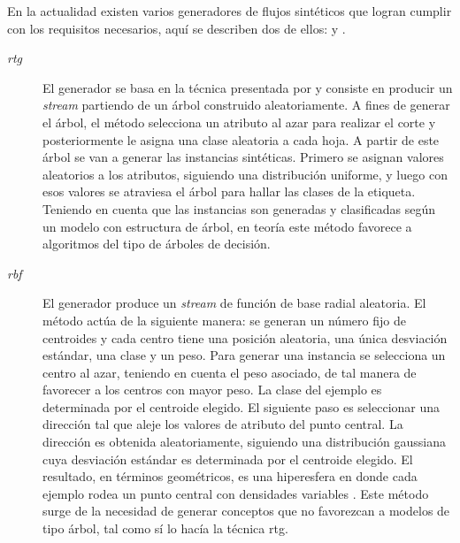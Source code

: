 En la actualidad existen varios generadores de flujos sintéticos que logran
cumplir con los requisitos necesarios, aquí se describen dos de ellos:
 y .

\begin{description}

	\item[\textit{\acrfull{rtg}}] El generador se basa en la técnica presentada
	      por \citeauthor{domingos_mining_2002} \cite{domingos_mining_2002} y
	      consiste en producir un \textit{stream} partiendo de un árbol construido
	      aleatoriamente. A fines de generar el árbol, el método selecciona un
	      atributo al azar para realizar el corte y posteriormente le asigna una
	      clase aleatoria a cada hoja. A partir de este árbol se van a generar las
	      instancias sintéticas.  Primero se asignan valores aleatorios a los
	      atributos, siguiendo una distribución uniforme, y luego con esos valores se
	      atraviesa el árbol para hallar las clases de la etiqueta. Teniendo en
	      cuenta que las instancias son generadas y clasificadas según un modelo con
	      estructura de árbol, en teoría este método favorece a algoritmos del tipo
	      de árboles de decisión.

	\item[\textit{\acrfull{rbf}}] El generador produce un \textit{stream} de
	      función de base radial aleatoria. El método actúa de la siguiente manera:
	      se generan un número fijo de centroides y cada centro tiene una posición
	      aleatoria, una única desviación estándar, una clase y un peso. Para
	      generar una instancia se selecciona un centro al azar, teniendo en cuenta
	      el peso asociado, de tal manera de favorecer a los centros con mayor peso.
	      La clase del ejemplo es determinada por el centroide elegido. El siguiente
	      paso es seleccionar una dirección tal que aleje los valores de atributo
	      del punto central. La dirección es obtenida aleatoriamente, siguiendo una
	      distribución gaussiana cuya desviación estándar es determinada por el
	      centroide elegido.  El resultado, en términos geométricos, es una
	      hiperesfera en donde cada ejemplo rodea un punto central con densidades
	      variables \cite{kirkby_improving_2007}. Este método surge de la necesidad
	      de generar conceptos que no favorezcan a modelos de tipo árbol, tal como
	      sí lo hacía la técnica \acrshort{rtg}.

\end{description}

